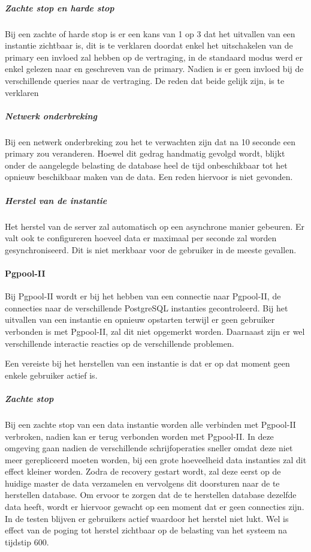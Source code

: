 \subparagraph{Zachte stop en harde stop} Bij een zachte of harde stop is er een kans van 1 op 3 dat het uitvallen van een instantie zichtbaar is, dit is te verklaren doordat enkel het uitschakelen van de primary een invloed zal hebben op de vertraging, in de standaard modus werd er enkel gelezen naar en geschreven van de primary. Nadien is er geen invloed bij de verschillende queries naar de vertraging. De reden dat beide gelijk zijn, is te verklaren \todo{}

\subparagraph{Netwerk onderbreking} Bij een netwerk onderbreking zou het te verwachten zijn dat na 10 seconde een primary zou veranderen. Hoewel dit gedrag handmatig gevolgd wordt, blijkt onder de aangelegde belasting de database heel de tijd onbeschikbaar tot het opnieuw beschikbaar maken van de data. Een reden hiervoor is niet gevonden. 

\subparagraph{Herstel van de instantie} Het herstel van de server zal automatisch op een asynchrone manier gebeuren. Er valt ook te configureren hoeveel data er maximaal per seconde zal worden gesynchroniseerd. Dit is niet merkbaar voor de gebruiker in de meeste gevallen. 

\paragraph{Pgpool-II} Bij Pgpool-II wordt er bij het hebben van een connectie naar Pgpool-II, de connecties naar de verschillende PostgreSQL instanties gecontroleerd. Bij het uitvallen van een instantie en opnieuw opstarten terwijl er geen gebruiker verbonden is met Pgpool-II, zal dit niet opgemerkt worden. Daarnaast zijn er wel verschillende interactie reacties op de verschillende problemen. 

Een vereiste bij het herstellen van een instantie is dat er op dat moment geen enkele gebruiker actief is. 

\subparagraph{Zachte stop} Bij een zachte stop van een data instantie worden alle verbinden met Pgpool-II verbroken, nadien kan er terug verbonden worden met Pgpool-II. In deze omgeving gaan nadien de verschillende schrijfoperaties sneller omdat deze niet meer gerepliceerd moeten worden, bij een grote hoeveelheid data instanties zal dit effect kleiner worden. Zodra de recovery gestart wordt, zal deze eerst op de huidige master de data verzamelen en vervolgens dit doorsturen naar de te herstellen database. Om ervoor te zorgen dat de te herstellen database dezelfde data heeft, wordt er hiervoor gewacht op een moment dat er geen connecties zijn. In de testen blijven er gebruikers actief waardoor het herstel niet lukt. Wel is effect van de poging tot herstel zichtbaar op de belasting van het systeem na tijdstip 600. 

